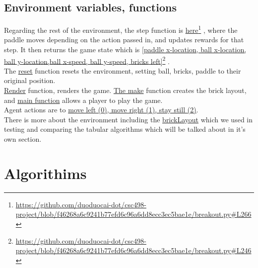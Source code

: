 \documentclass[twoside,11pt]{article}
\newcommand\fnurl[2]{%
  \href{#2}{#1}\footnote{\url{#2}}%
}
\begin{document}
\subsection{Environment variables, functions} 
Regarding the rest of the environment, the step function is \fnurl{here}{https://github.com/duoduocai-dot/csc498-project/blob/f46268a6c9241b77efd6c96a6dd8ecc3ec5bae1e/breakout.py\#L266}, where the paddle moves depending on the action passed in, and updates rewards for that step. It then returns the game state which is \fnurl{[paddle x-location, ball x-location, ball y-location,ball x-speed, ball y-speed, bricks left]}{https://github.com/duoduocai-dot/csc498-project/blob/f46268a6c9241b77efd6c96a6dd8ecc3ec5bae1e/breakout.py\#L246}.
\\
The \href{https://github.com/duoduocai-dot/csc498-project/blob/f46268a6c9241b77efd6c96a6dd8ecc3ec5bae1e/breakout.py#L299}{reset} function resets the environment, setting ball, bricks, paddle to their original position. 
\\ \href{https://github.com/duoduocai-dot/csc498-project/blob/f46268a6c9241b77efd6c96a6dd8ecc3ec5bae1e/breakout.py#L316}{Render} function, renders the game. \href{https://github.com/duoduocai-dot/csc498-project/blob/f46268a6c9241b77efd6c96a6dd8ecc3ec5bae1e/breakout.py#L332}{The make} function creates the brick layout, and \href{https://github.com/duoduocai-dot/csc498-project/blob/f46268a6c9241b77efd6c96a6dd8ecc3ec5bae1e/breakout.py#L335}{main function} allows a player to play the game. 
\\
Agent actions are to \href{https://github.com/duoduocai-dot/csc498-project/blob/f46268a6c9241b77efd6c96a6dd8ecc3ec5bae1e/breakout.py#L270}{move left (0), move right (1), stay still (2)}.
\\
There is more about the environment including the \href{https://github.com/duoduocai-dot/csc498-project/blob/f46268a6c9241b77efd6c96a6dd8ecc3ec5bae1e/breakout.py#L55}{brickLayout} which we used in testing and comparing the tabular algorithms which will be talked about in it's own section.  

\section{Algorithims}
\end{document}
